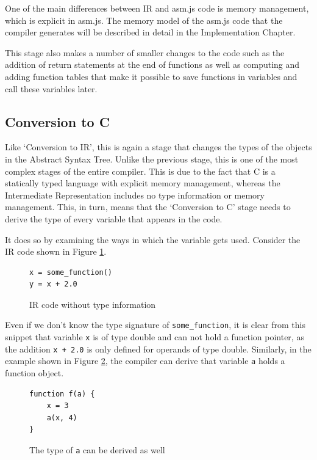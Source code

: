 \documentclass[11pt]{report}
\begin{document}
One of the main differences between IR and asm.js code is memory management, which is explicit in asm.js. The memory model of the asm.js code that the compiler generates will be described in detail in the Implementation Chapter.

This stage also makes a number of smaller changes to the code such as the addition of return statements at the end of functions as well as computing and adding function tables that make it possible to save functions in variables and call these variables later.

\subsection{Conversion to C}
Like `Conversion to IR', this is again a stage that changes the types of the objects in the Abstract Syntax Tree. Unlike the previous stage, this is one of the most complex stages of the entire compiler. This is due to the fact that C is a statically typed language with explicit memory management, whereas the Intermediate Representation includes no type information or memory management. This, in turn, means that the `Conversion to C' stage needs to derive the type of every variable that appears in the code.

It does so by examining the ways in which the variable gets used. Consider the IR code shown in Figure \ref{convc1}.
\begin{figure}[ht]
\begin{lstlisting}
x = some_function()
y = x + 2.0
\end{lstlisting}
\caption{IR code without type information}
\label{convc1}
\end{figure}

Even if we don't know the type signature of \texttt{some_function}, it is clear from this snippet that variable \texttt{x} is of type double and can not hold a function pointer, as the addition \texttt{x + 2.0} is only defined for operands of type double. Similarly, in the example shown in Figure \ref{convc2}, the compiler can derive that variable \texttt{a} holds a function object.
\begin{figure}[ht]
\begin{lstlisting}
function f(a) {
    x = 3
    a(x, 4)
}
\end{lstlisting}
\caption{The type of \texttt{a} can be derived as well}
\label{convc2}
\end{figure}

\end{document}
